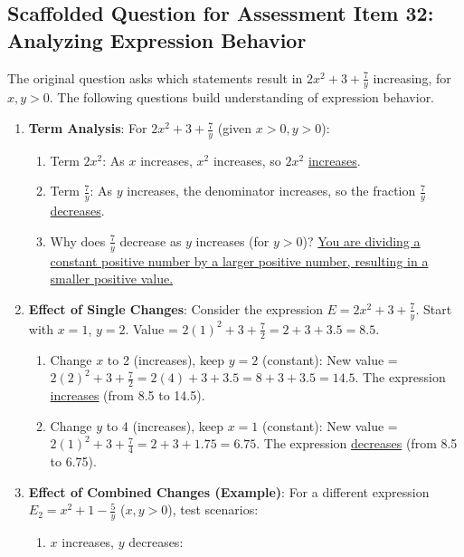 \documentclass[12pt]{article}
\begin{document}
\subsection*{Scaffolded Question for Assessment Item 32: Analyzing Expression Behavior}
The original question asks which statements result in \( 2x^2 + 3 + \frac{7}{y} \) increasing, for \( x, y > 0 \). The following questions build understanding of expression behavior.

\begin{enumerate}[label=32.\arabic*]
    \item \textbf{Term Analysis}: For \( 2x^2 + 3 + \frac{7}{y} \) (given \(x > 0, y > 0\)):
    \begin{enumerate}[label=\alph*)]
        \item Term \( 2x^2 \): As \( x \) increases, \(x^2\) increases, so \(2x^2\) \underline{increases}.
        \item Term \( \frac{7}{y} \): As \( y \) increases, the denominator increases, so the fraction \( \frac{7}{y} \) \underline{decreases}.
        \item Why does \( \frac{7}{y} \) decrease as \(y\) increases (for \(y>0\))? \underline{You are dividing a constant positive number by a larger positive number, resulting in a smaller positive value.}
    \end{enumerate}
    \item \textbf{Effect of Single Changes}: Consider the expression \( E = 2x^2 + 3 + \frac{7}{y} \).
    Start with \( x = 1 \), \( y = 2 \). Value = \( 2(1)^2 + 3 + \frac{7}{2} = 2 + 3 + 3.5 = 8.5 \).
    \begin{enumerate}[label=\alph*)]
        \item Change \( x \) to 2 (increases), keep \( y = 2 \) (constant):
        New value = \( 2(2)^2 + 3 + \frac{7}{2} = 2(4) + 3 + 3.5 = 8 + 3 + 3.5 = 14.5 \).
        The expression \underline{increases} (from 8.5 to 14.5).
        \item Change \( y \) to 4 (increases), keep \( x = 1 \) (constant):
        New value = \( 2(1)^2 + 3 + \frac{7}{4} = 2 + 3 + 1.75 = 6.75 \).
        The expression \underline{decreases} (from 8.5 to 6.75).
    \end{enumerate}
    \item \textbf{Effect of Combined Changes (Example)}: For a different expression \( E_2 = x^2 + 1 - \frac{5}{y} \) (\(x,y > 0\)), test scenarios:
    \begin{enumerate}[label=\alph*)]
        \item \( x \) increases, \( y \) decreases:

\end{enumerate}
\end{enumerate}
\end{document}

